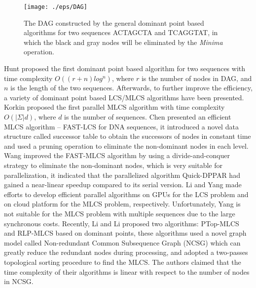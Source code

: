 \documentclass{article}
\begin{document}
\begin{figure}[htbp]
  \centering
  \texttt{[image: ./eps/DAG]}
  \caption{The DAG constructed by the general dominant point based
    algorithms for two sequences ACTAGCTA and TCAGGTAT, in which the
    black and gray nodes will be eliminated by the \emph{Minima}
    operation.}
  \label{fig:DAG}
\end{figure}

Hunt \cite{Hunt1977} proposed the first dominant point based algorithm
for two sequences with time complexity $O((r+n)log^n)$, where $r$ is
the number of nodes in DAG, and $n$ is the length of the two
sequences. Afterwards, to further improve the efficiency, a variety of
dominant point based LCS/MLCS algorithms have been presented. Korkin
\cite{Korkin2001} proposed the first parallel MLCS algorithm with time
complexity $O(|\Sigma|d)$, where $d$ is the number of sequences. Chen
\cite{Chen2006} presented an efficient MLCS algorithm -- FAST-LCS for
DNA sequences, it introduced a novel data structure called successor
table to obtain the successors of nodes in constant time and used a
pruning operation to eliminate the non-dominant nodes in each
level. Wang \cite{Wang2011} improved the FAST-MLCS algorithm by using
a divide-and-conquer strategy to eliminate the non-dominant nodes,
which is very suitable for parallelization, it indicated that the
parallelized algorithm Quick-DPPAR had gained a near-linear speedup
compared to its serial version. Li \cite{Li2012} and Yang
\cite{Yang2010} made efforts to develop efficient parallel algorithms
on GPUs for the LCS problem and on cloud platform for the MLCS
problem, respectively. Unfortunately, Yang \cite{Yang2010} is not
suitable for the MLCS problem with multiple sequences due to the large
synchronous costs. Recently, Li \cite{LiICDE} and Li \cite{LiSIGKDD}
proposed two algorithms: PTop-MLCS and RLP-MLCS based on dominant
points, these algorithms used a novel graph model called Non-redundant
Common Subsequence Graph (NCSG) which can greatly reduce the redundant
nodes during processing, and adopted a two-passes topological sorting
procedure to find the MLCS. The authors claimed that the time
complexity of their algorithms is linear with respect to the number of
nodes in NCSG.
\end{document}

